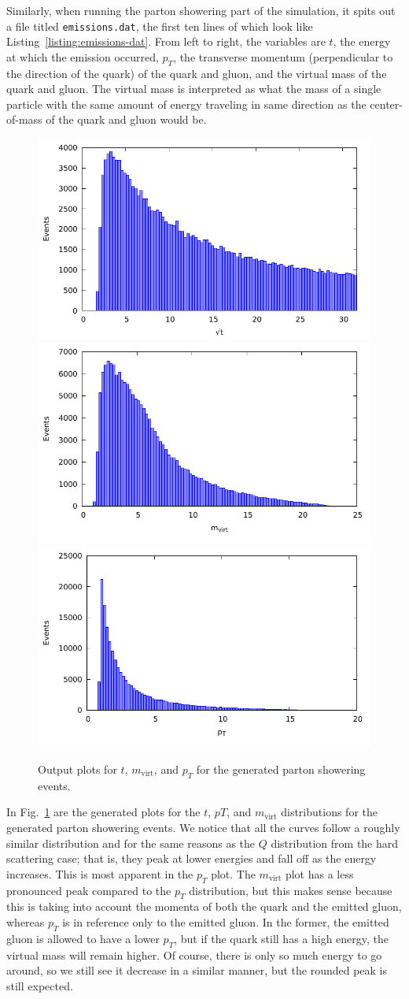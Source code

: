 Similarly, when running the parton showering part of the simulation, it spits out a file titled \texttt{emissions.dat}, the first ten lines of which look like Listing~\ref{listing:emissions-dat}. From left to right, the variables are $t$, the energy at which the emission occurred, $p_T$, the transverse momentum (perpendicular to the direction of the quark) of the quark and gluon, and the virtual mass of the quark and gluon. The virtual mass is interpreted as what the mass of a single particle with the same amount of energy traveling in same direction as the center-of-mass of the quark and gluon would be.

\begin{figure}[ht]
  \centering
  \includegraphics[width=0.32\linewidth]{./res/gfx/results/t.pdf}
  \includegraphics[width=0.32\linewidth]{./res/gfx/results/m.pdf}
  \includegraphics[width=0.32\linewidth]{./res/gfx/results/pT.pdf}
  \caption{Output plots for $t$, $m_{\mathrm{virt}}$, and $p_T$ for the generated parton showering events.}
  \label{fig:partonshower-dist}
\end{figure}

In Fig.~\ref{fig:partonshower-dist} are the generated plots for the $t$, $pT$, and $m_{\mathrm{virt}}$ distributions for the generated parton showering events. We notice that all the curves follow a roughly similar distribution and for the same reasons as the $Q$ distribution from the hard scattering case; that is, they peak at lower energies and fall off as the energy increases. This is most apparent in the $p_T$ plot. The $m_{\mathrm{virt}}$ plot has a less pronounced peak compared to the $p_T$ distribution, but this makes sense because this is taking into account the momenta of both the quark and the emitted gluon, whereas $p_T$ is in reference only to the emitted gluon. In the former, the emitted gluon is allowed to have a lower $p_T$, but if the quark still has a high energy, the virtual mass will remain higher. Of course, there is only so much energy to go around, so we still see it decrease in a similar manner, but the rounded peak is still expected.

